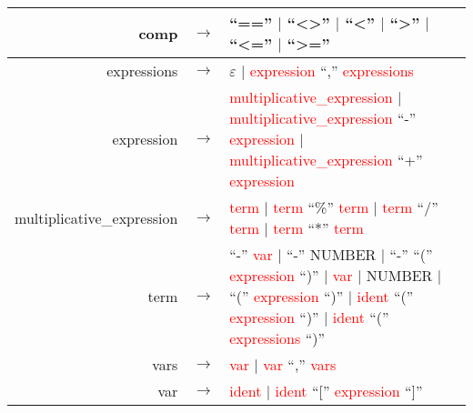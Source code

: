 \documentclass{article}[12pt]
\newcommand{\prodrule}[1]{#1}
\newcommand{\nonterm}[1]{\textcolor{red}{#1}}
\newcommand{\term}[1]{#1}
\begin{document}
\begin{tabular}{r c p{10cm}}
	\prodrule{comp} & $\rightarrow$ &
		        \term{``==''} 
		$\vert$ \term{``\textless\textgreater''} 
		$\vert$ \term{``\textless''} 
		$\vert$ \term{``\textgreater''} 
		$\vert$ \term{``\textless=''} 
		$\vert$ \term{``\textgreater=''} \\
	\hline

	\prodrule{expressions} & $\rightarrow$ &
		        $\varepsilon$
		$\vert$ \nonterm{expression} \term{``,''} \nonterm{expressions} \\
	\hline

	\prodrule{expression} & $\rightarrow$ &
		        \nonterm{multiplicative\_expression} \newline
		$\vert$ \nonterm{multiplicative\_expression} \term{``-''} \nonterm{expression} \newline
		$\vert$ \nonterm{multiplicative\_expression} \term{``+''} \nonterm{expression} \\
	\hline

	\prodrule{multiplicative\_expression} & $\rightarrow$ &
		        \nonterm{term} 
		$\vert$ \nonterm{term} \term{``\%''} \nonterm{term} 
		$\vert$ \nonterm{term} \term{``/''} \nonterm{term} 
		$\vert$ \nonterm{term} \term{``*''} \nonterm{term} \\
	\hline

	\prodrule{term} & $\rightarrow$ &
		        \term{``-''} \nonterm{var} \newline
		$\vert$ \term{``-''} \term{NUMBER} \newline
		$\vert$ \term{``-''} \term{``(''} \nonterm{expression} \term{``)''} \newline
		$\vert$ \nonterm{var} \newline
		$\vert$ \term{NUMBER} \newline
		$\vert$ \term{``(''} \nonterm{expression} \term{``)''} \newline
		$\vert$ \nonterm{ident} \term{``(''} \nonterm{expression} \term{``)''} \newline
		$\vert$ \nonterm{ident} \term{``(''} \nonterm{expressions} \term{``)''} \\
	\hline

	\prodrule{vars} & $\rightarrow$ &
		        \nonterm{var}
		$\vert$ \nonterm{var} \term{``,''} \nonterm{vars} \\
	\hline

	\prodrule{var} & $\rightarrow$ &
		        \nonterm{ident}
		$\vert$ \nonterm{ident} \term{``[''} \nonterm{expression} \term{``]''} \\
\end{tabular}
\end{document}
